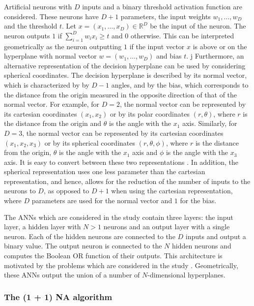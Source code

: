 Artificial neurons with $D$ inputs and a binary threshold activation function are considered.
These neurons have $D + 1$ parameters, the input weights $w_1, \ldots, w_D$ and the threshold $t$.
Let $x = (x_1, \ldots, x_D) \in \mathds{R}^D$ be the input of the neuron. The neuron outputs $1$ if $\sum_{i=1}^D w_i x_i \geq t$ and $0$
otherwise.
This can be interpreted geometrically as the neuron outputting $1$ if the input vector $x$ is above or on the hyperplane with normal vector
$w = (w_1, \ldots, w_D)$ and bias $t$.
j
Furthermore, an alternative representation of the decision hyperplane can be used by considering spherical coordinates.
The decision hyperplane is described by its normal vector, which is characterized by by $D - 1$ angles, and by the bias, which corresponds to the distance from the origin
measured in the opposite direction of that of the normal vector.
For example, for $D = 2$, the normal vector can be represented by its cartesian coordinates $(x_1, x_2)$ or by its polar coordinates
$(r, \theta)$, where $r$ is the distance from the origin and $\theta$ is the angle with the $x_1$ axis. Similarly, for $D = 3$, the normal vector can
be represented by its cartesian coordinates $(x_1, x_2, x_3)$ or by its spherical coordinates $(r, \theta, \phi)$, where $r$ is the distance from the
origin, $\theta$ is the angle with the $x_1$ axis and $\phi$ is the angle with the $x_3$ axis.
It is easy to convert between these two representations \cite{spherical}. In addition, the spherical representation uses one less parameter than the cartesian
representation, and hence, allows for the reduction of the number of inputs to the neurons to $D$, as opposed to $D + 1$ when using the cartesian representation,
where $D$ parameters are used for the normal vector and $1$ for the bias.


The ANNs which are considered in the study contain three layers: the input layer, a hidden layer with $N > 1$ neurons and an output layer with a single neuron.
Each of the hidden neurons are connected to the $D$ inputs and output a binary value. The output neuron is connected to the $N$ hidden neurons and
computes the Boolean OR function of their outputs.
This architecture is motivated by the problems which are considered in the study \cite{na}.
Geometrically, these ANNs output the union of a number of $N$-dimensional hyperplanes.


\subsubsection{The (1 + 1) NA algorithm}

